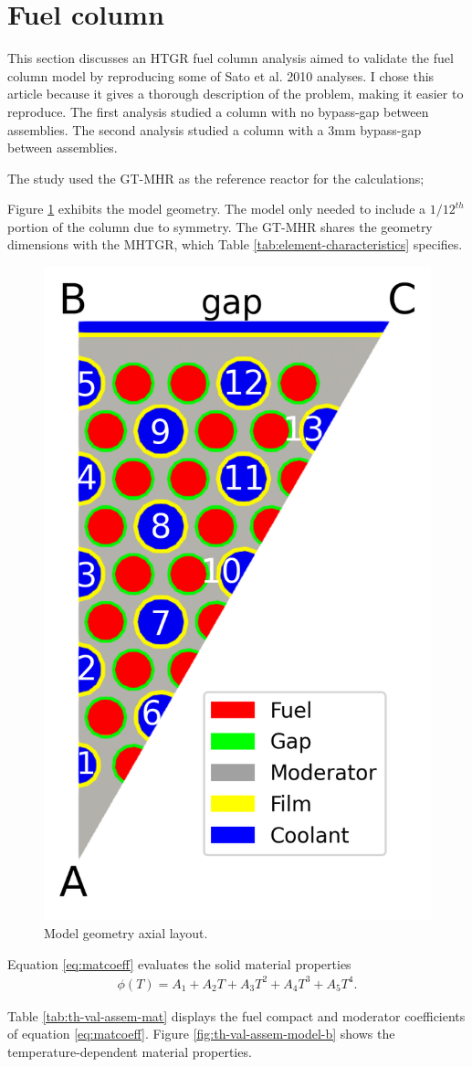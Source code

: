 \section{Fuel column}
\label{sec:fuelcol}

This section discusses an HTGR fuel column analysis aimed to validate the fuel column model by reproducing some of Sato et al. 2010 \cite{sato_computational_2010} analyses.
I chose this article because it gives a thorough description of the problem, making it easier to reproduce.
The first analysis studied a column with no bypass-gap between assemblies.
The second analysis studied a column with a 3mm bypass-gap between assemblies.

The study used the GT-MHR as the reference reactor for the calculations; 

Figure \ref{fig:th-val-assem-model-a} exhibits the model geometry.
The model only needed to include a $1/12^{th}$ portion of the column due to symmetry.
The GT-MHR shares the geometry dimensions with the MHTGR, which Table \ref{tab:element-characteristics} specifies.

\begin{figure}[htbp!]
  \centering
  \includegraphics[width=0.25\linewidth]{figures-thermal/val-assem-mesh}
  \hfill
  \caption{Model geometry axial layout.}
  \label{fig:th-val-assem-model-a}
\end{figure}

Equation \ref{eq:matcoeff} evaluates the solid material properties \cite{johnson_cfd_2009}
\begin{align}
  \phi(T) = A_1 + A_2 T + A_3 T^2 + A_4 T^3 + A_5 T^4.  \label{eq:matcoeff}
\end{align}

Table \ref{tab:th-val-assem-mat} displays the fuel compact and moderator coefficients of equation \ref{eq:matcoeff}.
Figure \ref{fig:th-val-assem-model-b} shows the temperature-dependent material properties.

